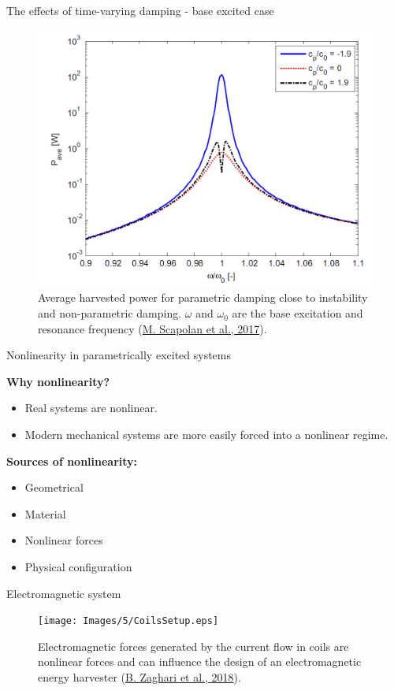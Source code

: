 \documentclass[LaTeX2e,10pt]{beamer}
\begin{document}
\begin{frame}{The effects of time-varying damping - base excited case}
\begin{figure}
\includegraphics[width=0.75\linewidth]{Images/AveragePower.png}
\caption{Average harvested power for parametric damping close to instability and non-parametric damping. $\omega$ and $\omega_0$ are the base excitation and resonance frequency (\href{https://www.sciencedirect.com/science/article/pii/S0888327016000881}{M. Scapolan et al., 2017}).} 
\end{figure}
\end{frame}
\begin{frame}{Nonlinearity in parametrically excited systems}

\textbf{Why nonlinearity?}
\begin{itemize}
\setlength\itemsep{0.4cm}
	\item Real systems are nonlinear.
	\item Modern mechanical systems are more easily forced into a nonlinear regime.
\end{itemize}
\vspace{1em}
\textbf{Sources of nonlinearity:}
\begin{itemize}
\setlength\itemsep{0.4cm}
	\item Geometrical
	\item Material
	\item Nonlinear forces
	\item Physical configuration
\end{itemize}
\end{frame}
\begin{frame}{Electromagnetic system}
\begin{figure}
		\centering
		\texttt{[image: Images/5/CoilsSetup.eps]}
		\caption{Electromagnetic forces generated by the current flow in coils are nonlinear forces and can influence the design of an electromagnetic energy harvester (\href{http://journals.sagepub.com/doi/full/10.1177/1077546318783566}{B. Zaghari et al., 2018}).}
	\end{figure}
\end{frame}	
\end{document}
